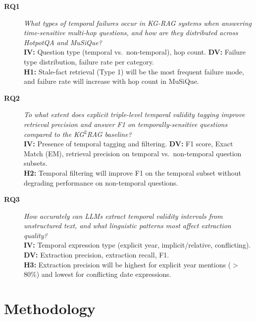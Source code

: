 \documentclass[11pt]{article}
\begin{document}
\begin{description}
  \item[\textbf{RQ1}] \textit{What types of temporal failures occur in
    KG-RAG systems when answering time-sensitive multi-hop questions,
    and how are they distributed across HotpotQA and MuSiQue?}\\
    \textbf{IV:} Question type (temporal vs.\ non-temporal), hop count.
    \textbf{DV:} Failure type distribution, failure rate per category.\\
    \textbf{H1:} Stale-fact retrieval (Type 1) will be the most frequent
    failure mode, and failure rate will increase with hop count in MuSiQue.

  \item[\textbf{RQ2}] \textit{To what extent does explicit triple-level
    temporal validity tagging improve retrieval precision and answer F1
    on temporally-sensitive questions compared to the KG$^2$RAG baseline?}\\
    \textbf{IV:} Presence of temporal tagging and filtering.
    \textbf{DV:} F1 score, Exact Match (EM), retrieval precision on
    temporal vs.\ non-temporal question subsets.\\
    \textbf{H2:} Temporal filtering will improve F1 on the temporal subset
    without degrading performance on non-temporal questions.

  \item[\textbf{RQ3}] \textit{How accurately can LLMs extract temporal
    validity intervals from unstructured text, and what linguistic patterns
    most affect extraction quality?}\\
    \textbf{IV:} Temporal expression type (explicit year, implicit/relative,
    conflicting).
    \textbf{DV:} Extraction precision, extraction recall, F1.\\
    \textbf{H3:} Extraction precision will be highest for explicit year
    mentions ($>$80\%) and lowest for conflicting date expressions.
\end{description}

\section{Methodology}
\end{document}
